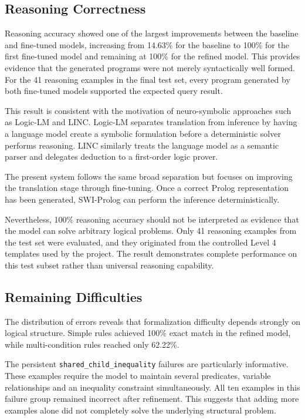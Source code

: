 \documentclass[11pt]{article} %
\theoremstyle{plain}
\theoremstyle{definition}
\begin{document}
\subsection{Reasoning Correctness}

Reasoning accuracy showed one of the largest improvements between the baseline
and fine-tuned models, increasing from 14.63\% for the baseline to 100\% for
the first fine-tuned model and remaining at 100\% for the refined model. This
provides evidence that the generated programs were not merely syntactically
well formed. For the 41 reasoning examples in the final test set, every program
generated by both fine-tuned models supported the expected query result.

This result is consistent with the motivation of neuro-symbolic approaches
such as Logic-LM and LINC. Logic-LM separates translation from inference by
having a language model create a symbolic formulation before a deterministic
solver performs reasoning. LINC similarly treats the language model as a
semantic parser and delegates deduction to a first-order logic prover.

The present system follows the same broad separation but focuses on improving
the translation stage through fine-tuning. Once a correct Prolog
representation has been generated, SWI-Prolog can perform the inference
deterministically.

Nevertheless, 100\% reasoning accuracy should not be interpreted as evidence
that the model can solve arbitrary logical problems. Only 41 reasoning examples
from the test set were evaluated, and they originated from the controlled
Level 4 templates used by the project. The result demonstrates complete
performance on this test subset rather than universal reasoning capability.


\subsection{Remaining Difficulties}

The distribution of errors reveals that formalization difficulty depends
strongly on logical structure. Simple rules achieved 100\% exact match in the
refined model, while multi-condition rules reached only 62.22\%.

The persistent \texttt{shared\_child\_inequality} failures are particularly
informative. These examples require the model to maintain several predicates,
variable relationships and an inequality constraint simultaneously. All ten
examples in this failure group remained incorrect after refinement. This
suggests that adding more examples alone did not completely solve the
underlying structural problem.
\end{document}
